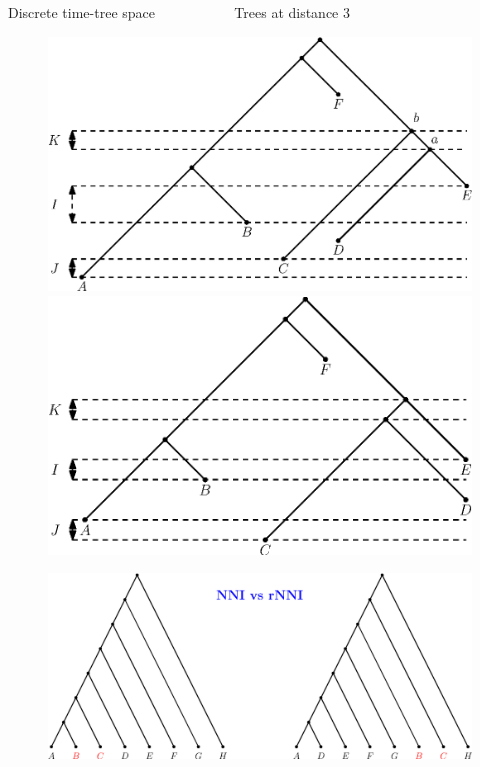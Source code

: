 \documentclass{beamer}
\theoremstyle{example}
\begin{document}
\begin{frame}{Discrete time-tree space}
\centering
{\small\color{blue} ~~~~~~~~~~ Trees at distance 3}
\vskip-8mm
\begin{figure}
\centering
\includegraphics[width=.53\framewidth]{dts_neighbours_left.eps}
\includegraphics[width=.53\framewidth]{dts_neighbours_right.eps}
\end{figure}

\pause

\begin{figure}
\centering
\includegraphics[width=.8\framewidth]{dts_nni.eps}
\end{figure}

\end{frame}
\end{document}

